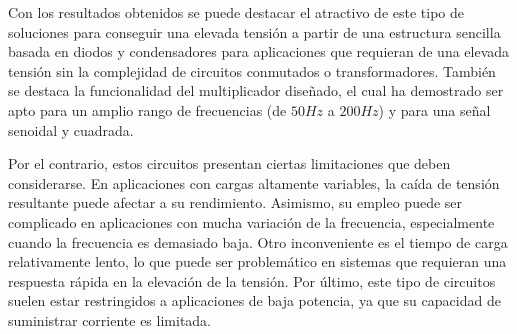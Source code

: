 Con los resultados obtenidos se puede destacar el atractivo de este tipo de soluciones para conseguir 
una elevada tensión a partir de una estructura sencilla basada en diodos y condensadores para aplicaciones 
que requieran de una elevada tensión sin la complejidad de circuitos conmutados o transformadores. También se 
destaca la funcionalidad del multiplicador diseñado, el cual ha demostrado ser apto para un amplio rango 
de frecuencias (de $50Hz$ a $200Hz$) y para una señal senoidal y cuadrada.

Por el contrario, estos circuitos presentan ciertas limitaciones que deben considerarse. En aplicaciones con 
cargas altamente variables, la caída de tensión resultante puede afectar a su rendimiento. Asimismo, su empleo puede 
ser complicado en aplicaciones 
con mucha variación de la frecuencia, especialmente cuando la frecuencia es demasiado baja. Otro inconveniente es el tiempo de carga relativamente lento, lo que puede 
ser problemático en sistemas que requieran una respuesta rápida en la elevación de la tensión. Por último, este tipo 
de circuitos suelen estar restringidos a aplicaciones de baja potencia, ya que su capacidad 
de suministrar corriente es limitada.

